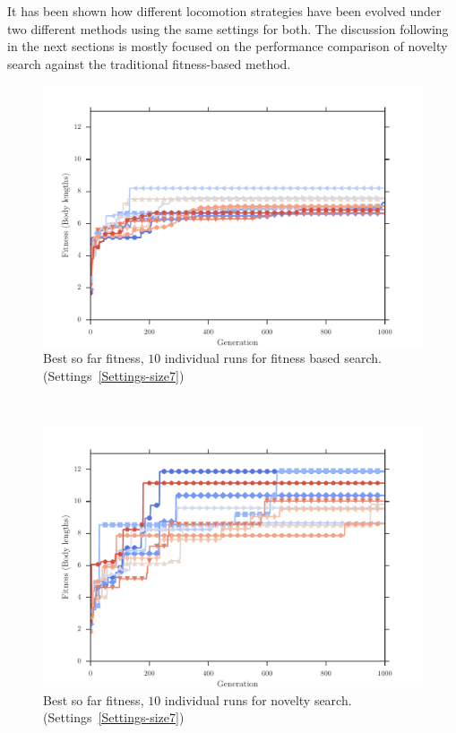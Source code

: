 It has been shown how different locomotion strategies have been evolved under two different methods using the same settings for both. The discussion following in the next sections is mostly focused on the performance comparison of novelty search against the traditional fitness-based method.





\clearpage


\begin{figure}[ht!]
\centering
\includegraphics[width=1.0\textwidth]{../Figures/Results/indRunnAvgSize7Fitness.pdf}
\caption{Best so far fitness, $10$ individual runs for fitness based search. (Settings~\ref{Settings-size7})}
\label{fig:indRunsAvgSize10Fitness}
\end{figure}
~
\begin{figure}[ht!]
\centering
\includegraphics[width=1.0\textwidth]{../Figures/Results/indRunnAvgSize7Novelty.pdf}
\caption{Best so far fitness, $10$ individual runs for novelty search. (Settings~\ref{Settings-size7})}
\label{fig:indRunnAvgSize10Novelty}
\end{figure}

